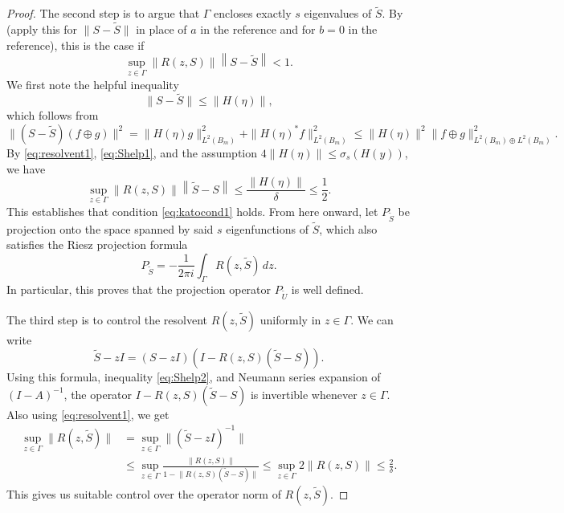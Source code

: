 \documentclass[11pt]{article}
\theoremstyle{definition}
\numberwithin{theorem}{section}
\numberwithin{lemma}{section}
\numberwithin{equation}{section}
\renewcommand{\tilde}{\widetilde}
\newcommand{\norm}[1]{{\left\|#1\right\|}}
\numberwithin{equation}{section}
\begin{document}
\begin{proof}
		The second step is to argue that $\Gamma$ encloses exactly $s$ eigenvalues of $\tilde S$. By \cite[Theorem 3.18 on page 214]{kato2013perturbation} (apply this for $\|S-\tilde S\|$ in place of $a$ in the reference and for $b=0$ in the reference), this is the case if
		\begin{equation}
			\label{eq:katocond1}
			\sup_{z\in \Gamma} \norm{R(z,S)} \norm{S-\tilde S}
			< 1.
		\end{equation}
		We first note the helpful inequality 
		\begin{equation}
			\label{eq:Shelp1}
			\big\|S-\tilde S\big\|
			\leq \|H(\eta)\|,
		\end{equation}
		which follows from 
		$$
		\big\|(S-\tilde S)(f\oplus g)\big\|^2
		=\| H(\eta) g\|_{L^2(B_m)}^2 + \| H(\eta)^* f\|_{L^2(B_m)}^2 
		\leq \|H(\eta)\|^2 \|f\oplus g\|_{L^2(B_m)\oplus L^2(B_m)}^2.
		$$
		By \eqref{eq:resolvent1}, \eqref{eq:Shelp1}, and the assumption $4\|H(\eta)\|\leq \sigma_s(H(y))$, we have
		\begin{equation}
			\label{eq:Shelp2}
			\sup_{z\in \Gamma} \big\|R(z,S)\|\norm{\tilde S-S}
			\leq \frac{\|H(\eta)\|}{\delta}
			\leq \frac 12.
		\end{equation}
		This establishes that condition \eqref{eq:katocond1} holds. From here onward, let $P_{\tilde S}$ be projection onto the space spanned by said $s$ eigenfunctions of $\tilde S$, which also satisfies the Riesz projection formula 
		\begin{equation*}
			P_{\tilde S} = - \frac{1}{2\pi i}\int_\Gamma R(z,\tilde S)\, dz.
		\end{equation*} 
		In particular, this proves that the projection operator $P_{\tilde U}$ is well defined. 
		
		The third step is to control the resolvent $R(z,\tilde S)$ uniformly in $z\in \Gamma$. We can write
		$$
		\tilde S - zI
		=(S-zI) (I-R(z,S) (\tilde S-S)).
		$$
		Using this formula, inequality \eqref{eq:Shelp2}, and Neumann series expansion of $(I-A)^{-1}$, the operator $I-R(z,S) (\tilde S-S)$ is invertible whenever $z\in \Gamma$. Also using \eqref{eq:resolvent1}, we get
		\begin{equation}
			\label{eq:resolvent2}
			\begin{split}
				\sup_{z\in \Gamma} \big\|R(z,\tilde S)\big\|
				&= \sup_{z\in \Gamma} \big\|(\tilde S - zI)^{-1} \big\| \\
				&\leq \sup_{z\in \Gamma}  \frac{\norm{R(z,S)}}{1-\big\|R(z,S)(\tilde S-S)\big\|} 
				\leq \sup_{z\in \Gamma}  2\norm{R(z,S)}
				\leq \frac 2 \delta.
			\end{split}
		\end{equation}
		This gives us suitable control over the operator norm of $R(z,\tilde S)$.
		

\end{proof}
\end{document}
